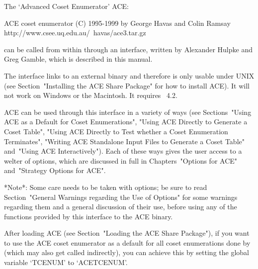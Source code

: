 
\def\ACE{{\sf ACE}}

The \lq{}Advanced Coset Enumerator' {\ACE}:

\begintt
ACE coset enumerator (C) 1995-1999 by George Havas and Colin Ramsay
    http://www.csee.uq.edu.au/~havas/ace3.tar.gz
\endtt

can  be called  from within  {\GAP} through  an interface,  written by
Alexander Hulpke and Greg Gamble, which is described in this manual.

The interface links to an external binary and therefore is only usable
under UNIX (see Section~"Installing the ACE Share Package" for how  to
install {\ACE}).  It will not work  on  Windows  or the Macintosh.  It
requires {\GAP}~4.2.

{\ACE} can be used through this interface in a variety  of  ways  (see
Sections~"Using ACE as a Default for Coset Enumerations",  "Using  ACE
Directly to Generate a Coset  Table",  "Using  ACE  Directly  to  Test
whether a Coset Enumeration Terminates", "Writing ACE Standalone Input
Files to Generate a Coset Table" and~"Using ACE Interactively").  Each
of these ways gives the user access to a welter of options, which  are
discussed in full in Chapters~"Options for ACE" and~"Strategy  Options
for ACE". 

*Note*: Some care needs to be taken with  options;  be  sure  to  read
Section~"General Warnings regarding  the  Use  of  Options"  for  some
warnings regarding them and a general discussion of their use,  before
using any of the functions provided by this interface  to  the  {\ACE}
binary.


After loading  {\ACE}   (see Section~"Loading the ACE Share Package"),
if you  want to use the {\ACE}  coset enumerator as a  default for all
coset  enumerations  done  by   {\GAP}  (which  may  also  get  called
indirectly),  you can  achieve  this by  setting  the global  variable
`TCENUM' to `ACETCENUM'.

